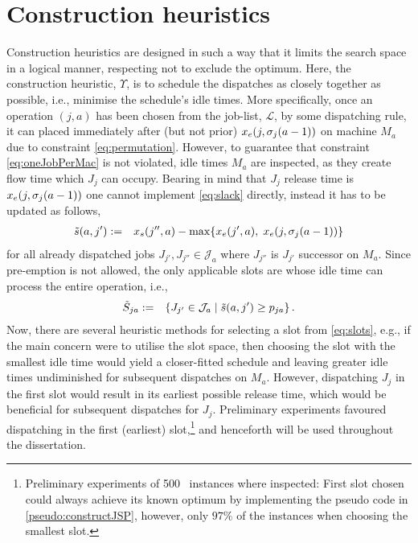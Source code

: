 \section{Construction heuristics}\label{sec:CH}
Construction heuristics are designed in such a way that it limits the search 
space in a logical manner, respecting not to exclude the optimum. Here, the 
construction heuristic, $\Upsilon$, is to schedule the dispatches as closely 
together as possible, i.e., minimise the schedule's idle times. 
More specifically, once an operation $(j,a)$ has been chosen from the job-list, 
$\mathcal{L}$, by some dispatching rule, it can placed immediately after (but 
not prior) $x_e(j,{\mathbf{\sigma}}_j(a-1))$ on machine $M_a$ due to constraint 
\cref{eq:permutation}. 
However, to guarantee that constraint \cref{eq:oneJobPerMac} is not violated, 
idle times $M_a$ are inspected, as they create flow time  which $J_j$ can 
occupy. Bearing in mind that $J_j$ release time is $x_e(j,{\mathbf{\sigma}}_j(a-1))$ one 
cannot implement \cref{eq:slack} directly, instead it has to be updated as 
follows,
\begin{eqnarray}
	\tilde{s}(a,j')&:=& x_s(j'',a)-\max\{x_e(j',a),\;x_e(j,\vsigma_j(a-1))\} %
\end{eqnarray}
for all already dispatched jobs $J_{j'},J_{j''}\in \mathcal{J}_a$ where $J_{j''}$ is $J_{j'}$ successor on $M_a$. Since pre-emption is not allowed, the only applicable slots are whose idle time can process the entire operation, i.e.,
\begin{eqnarray}
	\tilde{S}_{ja}&:=&\condset{J_{j'}\in \mathcal{J}_a}{\tilde{s}(a,j')\geq 
	p_{ja} }\label{eq:slots}.
\end{eqnarray} 
Now, there are several heuristic methods for selecting a slot from 
\cref{eq:slots}, e.g., if the main concern were to utilise the slot space, then 
choosing the slot with the smallest idle time would yield a closer-fitted 
schedule and leaving greater idle times undiminished for subsequent dispatches 
on $M_a$. However, dispatching $J_j$ in the first slot would result in its 
earliest possible release time, which would be beneficial for subsequent 
dispatches for $J_j$. Preliminary experiments favoured dispatching in the first 
(earliest) slot,\footnote{Preliminary experiments of 500 \JSP\ instances where 
inspected: First slot chosen could always achieve its known optimum by 
implementing the pseudo code in \cref{pseudo:constructJSP}, however, only 
$97\%$ of the instances when choosing the smallest slot.} and henceforth will 
be used throughout the dissertation.

